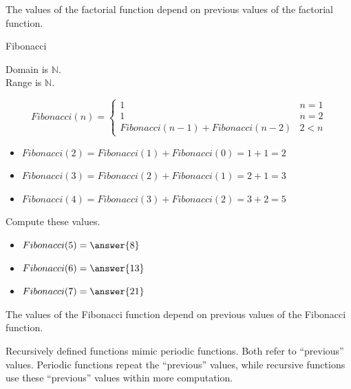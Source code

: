 \documentclass{ximera}
\begin{document}
The values of the factorial function depend on previous values of the factorial function. 












\begin{example}  Fibonacci


Domain is $\mathbb{N}$. \\
Range is $\mathbb{N}$. 



\[
Fibonacci(n) = 
\begin{cases}
  1 & n = 1 \\
  1 & n = 2 \\ 
  Fibonacci(n-1) + Fibonacci(n-2) & 2 < n
\end{cases}
\]


\begin{itemize}
\item $Fibonacci(2) = Fibonacci(1) + Fibonacci(0) = 1 + 1 = 2$
\item $Fibonacci(3) = Fibonacci(2) + Fibonacci(1) = 2 + 1 = 3$
\item $Fibonacci(4) = Fibonacci(3) + Fibonacci(2) = 3 + 2 = 5$
\end{itemize}




\begin{question} Compute these values.


\begin{itemize}
\item $Fibonacci(5) = \answer{8}$
\item $Fibonacci(6) = \answer{13}$
\item $Fibonacci(7) = \answer{21}$
\end{itemize}


\end{question}



\end{example}

The values of the Fibonacci function depend on previous values of the Fibonacci function.





Recursively defined functions mimic periodic functions.  Both refer to ``previous'' values.  Periodic functions repeat the ``previous'' values, while recursive functions use these ``previous'' values within more computation. 
\end{document}
